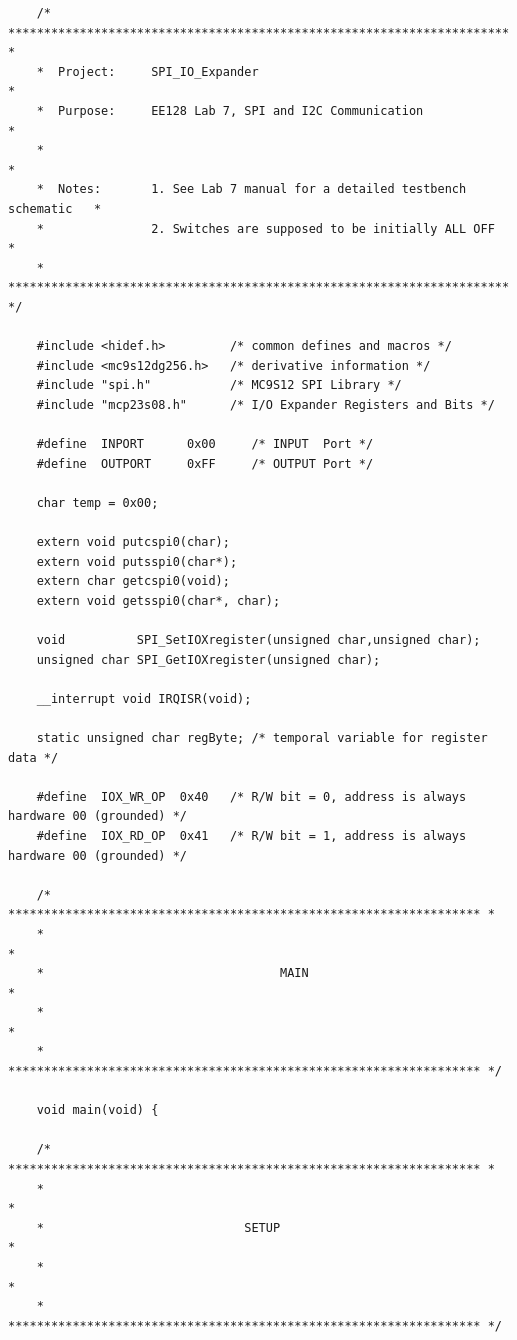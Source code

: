 \documentclass{article}
\begin{document}
	\begin{lstlisting}
	/* ********************************************************************** *
	*  Project:     SPI_IO_Expander                                          *
	*  Purpose:     EE128 Lab 7, SPI and I2C Communication                   *
	*                                                                        *
	*  Notes:       1. See Lab 7 manual for a detailed testbench schematic   *
	*               2. Switches are supposed to be initially ALL OFF         *
	* ********************************************************************** */
	
	#include <hidef.h>         /* common defines and macros */
	#include <mc9s12dg256.h>   /* derivative information */
	#include "spi.h"           /* MC9S12 SPI Library */
	#include "mcp23s08.h"      /* I/O Expander Registers and Bits */
	
	#define  INPORT      0x00     /* INPUT  Port */
	#define  OUTPORT     0xFF     /* OUTPUT Port */
	
	char temp = 0x00;
	
	extern void putcspi0(char);
	extern void putsspi0(char*);
	extern char getcspi0(void);
	extern void getsspi0(char*, char);
	
	void          SPI_SetIOXregister(unsigned char,unsigned char);
	unsigned char SPI_GetIOXregister(unsigned char); 
	
	__interrupt void IRQISR(void);
	
	static unsigned char regByte; /* temporal variable for register data */
	
	#define  IOX_WR_OP  0x40   /* R/W bit = 0, address is always hardware 00 (grounded) */
	#define  IOX_RD_OP  0x41   /* R/W bit = 1, address is always hardware 00 (grounded) */
	
	/* ****************************************************************** *
	*                                                                    *
	*                                 MAIN                               *
	*                                                                    *
	* ****************************************************************** */
	
	void main(void) {
	
	/* ****************************************************************** *
	*                                                                    *
	*                            SETUP                                   *
	*                                                                    *
	* ****************************************************************** */
	

\end{lstlisting}
\end{document}
